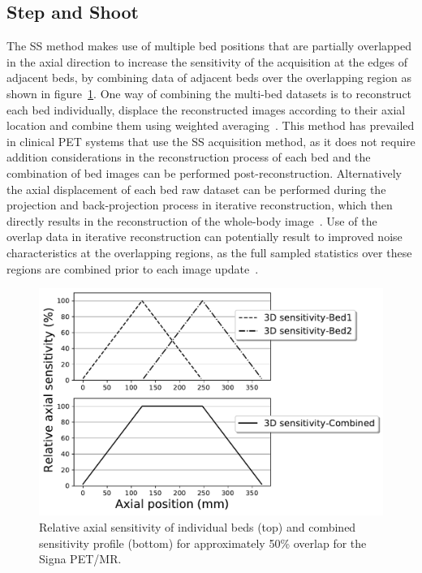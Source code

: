 \subsection{Step and Shoot}
\label{WB_Static_SS}
The SS method makes use of multiple bed positions that are partially overlapped in the axial direction to increase the sensitivity of the acquisition at the edges of adjacent beds, by combining data of adjacent beds over the overlapping region as shown in figure~\ref{fig3_1:fullOverlap}. 
One way of combining the multi-bed datasets is to reconstruct each bed individually, displace the reconstructed images according to their axial location and combine them using weighted averaging~\cite{Schubert1996}. This method has prevailed in clinical PET systems that use the SS acquisition method, as it does not require addition considerations in the reconstruction process of each bed and the combination of bed images can be performed post-reconstruction. Alternatively the axial displacement of each bed raw dataset can be performed during the projection and back-projection process in iterative reconstruction, which then directly results in the reconstruction of the whole-body image~\cite{Ross2004}. Use of the overlap data in iterative reconstruction can potentially result to improved noise characteristics at the overlapping regions, as the full sampled statistics over these regions are combined prior to each image update~\cite{Ross2004,Stute2014}. 
%
\begin{figure} [ht!]
\centering
\includegraphics[scale=0.6,angle=0]{2_Theory_Methods/figures/SensitivityProfiles_fullOverlap.pdf}
\caption{Relative axial sensitivity of individual beds (top) and combined sensitivity profile (bottom) for approximately 50\% overlap for the Signa PET/MR.}
\label{fig3_1:fullOverlap}
\end{figure}
